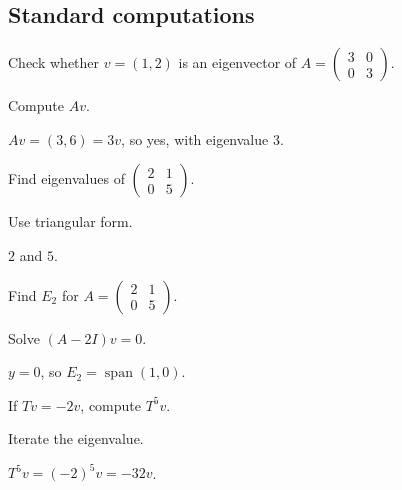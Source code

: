 \subsection*{Standard computations}

\begin{exercise}\label{exr:i09-expand-01}
Check whether \(v=(1,2)\) is an eigenvector of \(A=\begin{pmatrix}3&0\\0&3\end{pmatrix}\).
\end{exercise}
\begin{hint}
Compute \(Av\).
\end{hint}
\begin{solution}
\(Av=(3,6)=3v\), so yes, with eigenvalue \(3\).
\end{solution}

\begin{exercise}\label{exr:i09-expand-02}
Find eigenvalues of \(\begin{pmatrix}2&1\\0&5\end{pmatrix}\).
\end{exercise}
\begin{hint}
Use triangular form.
\end{hint}
\begin{solution}
\(2\) and \(5\).
\end{solution}

\begin{exercise}[Eigenspace]\label{exr:i09-expand-03}
Find \(E_2\) for \(A=\begin{pmatrix}2&1\\0&5\end{pmatrix}\).
\end{exercise}
\begin{hint}
Solve \((A-2I)v=0\).
\end{hint}
\begin{solution}
\(y=0\), so \(E_2=\operatorname{span}(1,0)\).
\end{solution}

\begin{exercise}\label{exr:i09-expand-04}
If \(Tv=-2v\), compute \(T^5v\).
\end{exercise}
\begin{hint}
Iterate the eigenvalue.
\end{hint}
\begin{solution}
\(T^5v=(-2)^5v=-32v\).
\end{solution}

